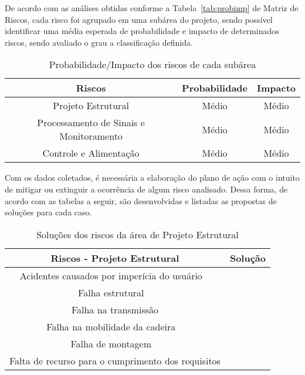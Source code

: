 De acordo com as análises obtidas conforme a Tabela~\ref{tab:probimp} de Matriz de Riscos,
cada risco foi agrupado em uma subárea do projeto, sendo possível identificar uma
média esperada de probabilidade e impacto de determinados riscos, sendo avaliado o
grau a classificação definida.

\begin{table}[h]
\centering
\vspace{0.5cm}
\begin{tabular}{|c|c|c|}
\hline
Riscos                    & Probabilidade & Impacto \\
\hline
Projeto Estrutural                 & Médio         & Médio \\
Processamento de Sinais e Monitoramento  & Médio         & Médio \\
Controle e Alimentação               & Médio         & Médio \\
\hline
\end{tabular}
\caption{Probabilidade/Impacto dos riscos de cada subárea}
\label{tab:probimparea}
\end{table}

Com os dados coletados, é necessária a elaboração do plano de ação com o
intuito de mitigar ou extinguir a ocorrência de algum risco analisado. Dessa forma, de
acordo com as tabelas a seguir, são desenvolvidas e listadas as propostas de soluções
para cada caso.

\begin{table}[h]
\centering
\vspace{0.5cm}
\begin{tabular}{|c|c|}
\hline
Riscos - Projeto Estrutural                                     & Solução \\
\hline
Acidentes causados por imperícia do usuário            & \\
Falha estrutural                                       & \\
Falha na transmissão                                   & \\
Falha na mobilidade da cadeira                         & \\
Falha de montagem                                      & \\
Falta de recurso para o cumprimento dos requisitos     & \\
\hline
\end{tabular}
\caption{Soluções dos riscos da área de Projeto Estrutural}
\label{tab:riscosubareaest}
\end{table}

